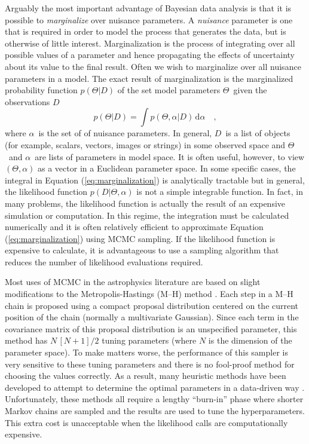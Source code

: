 \documentclass[12pt,preprint]{aastex}
\newcommand{\eq}[1]{Equation (\ref{eq:#1})}
\newcommand{\eqlabel}[1]{\label{eq:#1}}
\newcommand{\dd}{\mathrm{d}}
\renewcommand{\vector}[1]{#1}
\newcommand{\pr}[1]{\ensuremath{p(#1)}}
\newcommand{\model}{\ensuremath{\vector{\Theta}}}
\newcommand{\data}{\ensuremath{\vector{D}}}
\newcommand{\nuisance}{\ensuremath{\vector{\alpha}}}
\begin{document}
Arguably the most important advantage of Bayesian data analysis is
that it is possible to \emph{marginalize} over nuisance parameters. A
\emph{nuisance} parameter is one that is required in order to model the
process that generates the data, but is otherwise of little interest.
Marginalization is the process of integrating over all possible values of
a parameter and hence propagating the effects of uncertainty about
its value to the final result.  Often we wish to marginalize over all
nuisance parameters in a model.  The exact result of marginalization
is the marginalized probability function \pr{\model | \data}
of the set model parameters
\model\ given the observations \data
\begin{equation}
    \eqlabel{marginalization}
    \pr{\model | \data} = \int
        \pr{ \model, \nuisance | \data} \,
        \dd  \nuisance \quad,
\end{equation}
where \nuisance\ is the set of of nuisance parameters. In general, \data\ is
a list of objects (for example, scalars, vectors, images or strings) in some
observed space and \model\ and \nuisance\ are lists
of parameters in model space. It is often useful, however, to view
$(\model, \nuisance)$ as a vector in a Euclidean parameter space.
In some specific
cases, the integral in \eq{marginalization} is analytically tractable but in
general, the likelihood function
$p (\data | \model, \nuisance)$ is not a simple
integrable function. In fact, in many problems, the likelihood
function is actually the result of an expensive simulation or
computation. In this regime, the integration must be calculated numerically
and it is often relatively efficient to approximate \eq{marginalization}
using MCMC sampling. If the likelihood function is expensive to
calculate, it is advantageous to use a sampling algorithm that reduces the
number of likelihood evaluations required.

Most uses of MCMC in the astrophysics literature are based on slight
modifications to the Metropolis-Hastings (M--H) method
\citep[for example,][]{MacKay:2003}. Each step in a M--H chain is proposed
using a compact proposal distribution centered on the current position of the
chain (normally a multivariate Gaussian). Since
each term in the covariance matrix of this proposal distribution is an
unspecified parameter, this method has $N\,[N+1]/2$ tuning parameters (where
$N$ is the dimension of the parameter space).  To make matters worse, the
performance of this sampler is very sensitive to these
tuning parameters and there is no fool-proof method for choosing the values
correctly. As a result, many heuristic methods have been developed to attempt
to determine the optimal parameters in a data-driven way
\citep[for example,][]{Gregory:2005,Dunkley:2005,Widrow:2008}. Unfortunately,
these methods all require a lengthy ``burn-in'' phase where shorter Markov
chains are sampled and the results are used to tune the hyperparameters. This
extra cost is unacceptable when the likelihood calls are computationally
expensive.
\end{document}
